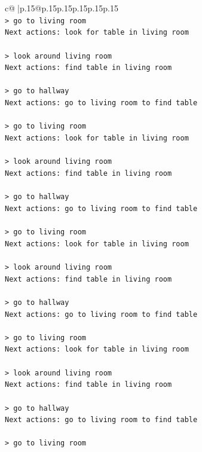 \documentclass{article}
\begin{document}
{\begin{supertabular}{c@{$\;$}|p{.15\linewidth}@{}p{.15\linewidth}p{.15\linewidth}p{.15\linewidth}p{.15\linewidth}p{.15\linewidth}}
{{{\\ 
\texttt{> go to living room} \\
\texttt{Next actions: look for table in living room} \\
\\ 
\texttt{> look around living room} \\
\texttt{Next actions: find table in living room} \\
\\ 
\texttt{> go to hallway} \\
\texttt{Next actions: go to living room to find table} \\
\\ 
\texttt{> go to living room} \\
\texttt{Next actions: look for table in living room} \\
\\ 
\texttt{> look around living room} \\
\texttt{Next actions: find table in living room} \\
\\ 
\texttt{> go to hallway} \\
\texttt{Next actions: go to living room to find table} \\
\\ 
\texttt{> go to living room} \\
\texttt{Next actions: look for table in living room} \\
\\ 
\texttt{> look around living room} \\
\texttt{Next actions: find table in living room} \\
\\ 
\texttt{> go to hallway} \\
\texttt{Next actions: go to living room to find table} \\
\\ 
\texttt{> go to living room} \\
\texttt{Next actions: look for table in living room} \\
\\ 
\texttt{> look around living room} \\
\texttt{Next actions: find table in living room} \\
\\ 
\texttt{> go to hallway} \\
\texttt{Next actions: go to living room to find table} \\
\\ 
\texttt{> go to living room} \\
}}}
\end{supertabular}}
\end{document}
